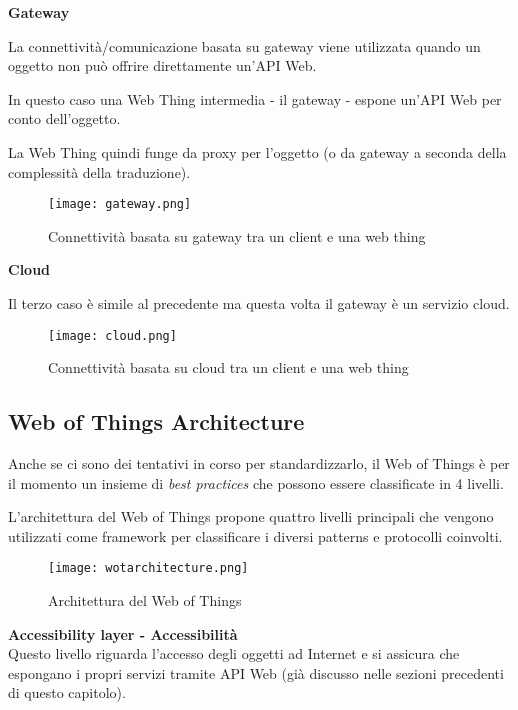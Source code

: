 \textbf{Gateway}

La connettività/comunicazione basata su gateway viene utilizzata quando un
oggetto non può offrire direttamente un'API Web.

In questo caso una Web Thing intermedia - il gateway - espone un'API Web
per conto dell'oggetto.

La Web Thing quindi funge da proxy per l'oggetto (o da gateway a seconda della
complessità della traduzione).

\begin{figure}[H]
  \centering
  \texttt{[image: gateway.png]}
  \caption{Connettività basata su gateway tra un client e una web thing}
  \label{fig:gateway}
\end{figure}

\textbf{Cloud}

Il terzo caso è simile al precedente ma questa volta il gateway è un servizio
cloud.

\begin{figure}[H]
  \centering
  \texttt{[image: cloud.png]}
  \caption{Connettività basata su cloud tra un client e una web thing}
  \label{fig:cloud}
\end{figure}

\subsection{Web of Things Architecture}

Anche se ci sono dei tentativi in corso per standardizzarlo, il Web of Things
è per il momento un insieme di \textit{best practices} che possono essere
classificate in 4 livelli.

L'architettura del Web of Things propone quattro livelli principali che vengono
utilizzati come framework per classificare i diversi patterns e protocolli
coinvolti.

\begin{figure}[H]
  \centering
  \texttt{[image: wotarchitecture.png]}
  \caption{Architettura del Web of Things}
  \label{fig:wotarchitecture}
\end{figure}

\textbf{Accessibility layer - Accessibilità}\\

Questo livello riguarda l'accesso degli oggetti ad
Internet e si assicura che espongano i propri servizi tramite API Web
(già discusso nelle sezioni precedenti di questo capitolo). \\

